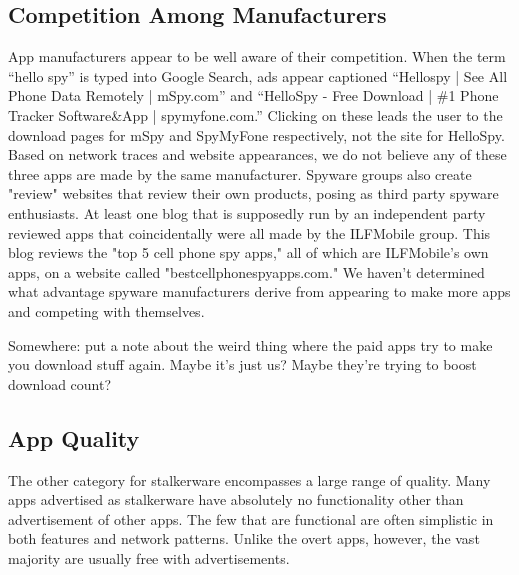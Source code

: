 \documentclass[acmtog]{acmart}
\begin{document}
\subsection{Competition Among Manufacturers}

App manufacturers appear to be well aware of their competition. When the term 
``hello spy'' is typed into Google Search, ads appear captioned ``Hellospy | 
See All Phone Data Remotely | mSpy.com'' and ``HelloSpy - Free Download | \#1 
Phone Tracker Software\&App | spymyfone.com.'' Clicking on these leads the user 
to the download pages for mSpy and SpyMyFone respectively, not the site for 
HelloSpy. Based on network traces and website appearances, we do not believe 
any of these three apps are made by the same manufacturer. Spyware groups also 
create "review" websites that review their own products, posing as third party 
spyware enthusiasts. At least one blog that is supposedly run by 
an independent party reviewed apps that coincidentally were all made by the 
ILFMobile group\cite{noauthor_best_nodate}. This blog reviews the 
"top 5 cell phone spy apps," all of which are ILFMobile's own apps, on a 
website called "bestcellphonespyapps.com." We haven't determined what advantage 
spyware manufacturers derive from appearing to make more apps and competing 
with themselves.

Somewhere: put a note about the weird thing where the paid apps try to make you 
download stuff again. Maybe it's just us? Maybe they're trying to boost 
download count?



\subsection{App Quality}

The other category for stalkerware encompasses a large range of quality. Many 
apps advertised as stalkerware have absolutely no functionality other than 
advertisement of other apps. The few that are functional are often simplistic 
in both features and network patterns. Unlike the overt apps, however, the vast 
majority are usually free with advertisements. 
\end{document}

